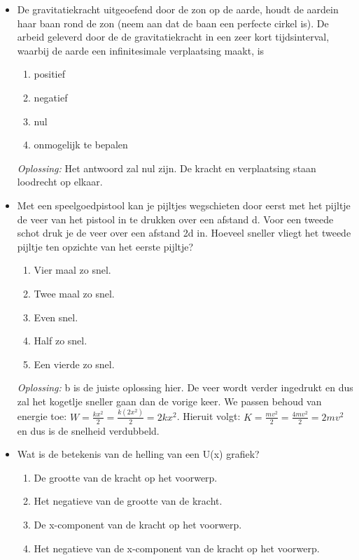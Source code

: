\documentclass[12pt,a4paper]{article}
\begin{document}
\begin{itemize}
	\newline
	\item De gravitatiekracht uitgeoefend door de zon op de aarde, houdt de aardein haar baan rond de zon (neem aan dat de baan een perfecte cirkel is). De arbeid geleverd door de de gravitatiekracht in een zeer kort tijdsinterval, waarbij de aarde een infinitesimale verplaatsing maakt, is
	\begin{enumerate}[label=\alph*]
		\item positief
		\item negatief
		\item nul
		\item onmogelijk te bepalen
	\end{enumerate}
	\textit{Oplossing:} Het antwoord zal nul zijn. De kracht en verplaatsing staan loodrecht op elkaar. 
	\newline
	\item Met een speelgoedpistool kan je pijltjes wegschieten door eerst met het pijltje de veer van het pistool in te drukken over een afstand d. Voor een tweede schot druk je de veer over een afstand 2d in. Hoeveel sneller vliegt het tweede pijltje ten opzichte van het eerste pijltje?
	\begin{enumerate}[label=\alph*]
		\item Vier maal zo snel.
		\item Twee maal zo snel.
		\item Even snel.
		\item Half zo snel.
		\item Een vierde zo snel.
	\end{enumerate}
	\textit{Oplossing:} b is de juiste oplossing hier. De veer wordt verder ingedrukt en dus zal het kogetlje sneller gaan dan de vorige keer. We passen behoud van energie toe: \(W = \frac{kx^2}{2} = \frac{k(2x^2)}{2} = 2kx^2\). Hieruit volgt: \(K = \frac{mv^2}{2} = \frac{4mv^2}{2} = 2mv^2\) en dus is de snelheid verdubbeld.
	\newline
	\item Wat is de betekenis van de helling van een U(x) grafiek?
	\begin{enumerate}[label=\alph*]
		\item De grootte van de kracht op het voorwerp.
		\item Het negatieve van de grootte van de kracht. 
		\item De x-component van de kracht op het voorwerp. 
		\item Het negatieve van de x-component van de kracht op het voorwerp. 

\end{enumerate}
\end{itemize}
\end{document}
